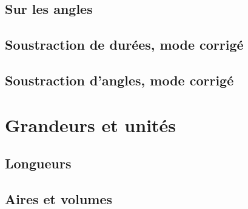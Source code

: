 \documentclass[11pt,a4paper]{article}
\begin{document}
\begin{center}
\end{center}

\subsection{Sur les angles}

\begin{center}
\end{center}

\subsection{Soustraction de durées, mode corrigé}

\begin{center}
\end{center}

\subsection{Soustraction d'angles, mode corrigé}

\begin{center}
\end{center}

\section{Grandeurs et unités}

\subsection{Longueurs}




\subsection{Aires et volumes}


\end{document}
